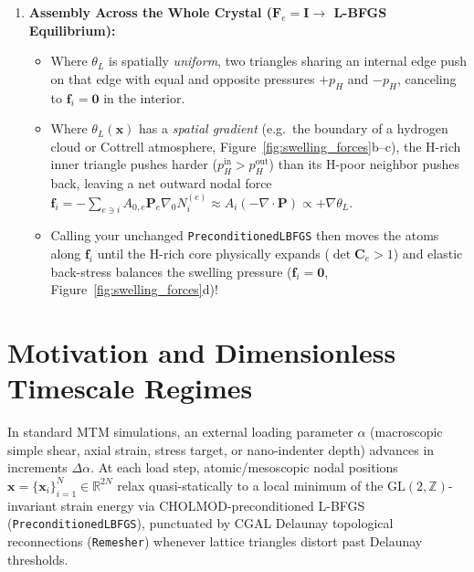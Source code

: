 \documentclass[11pt,a4paper]{article}
\newcommand{\R}{\mathbb{R}}
\newcommand{\Z}{\mathbb{Z}}
\newcommand{\code}[1]{\texttt{#1}}
\begin{document}
\begin{enumerate}[nosep]
\begin{equation}
    \mathbf{f}_{2,e} = \frac{p_H}{2}\begin{pmatrix}\phantom{+}0\\+1\end{pmatrix}\;\uparrow.
  \end{equation}
  All three corners are pushed \textbf{outward} to inflate the triangle (Figure~\ref{fig:swelling_forces}b, left), with $\mathbf{f}_{0,e}+\mathbf{f}_{1,e}+\mathbf{f}_{2,e}=\mathbf{0}$!
  \item \textbf{Assembly Across the Whole Crystal ($\mathbf{F}_e=\mathbf{I} \to$ L-BFGS Equilibrium):}
  \begin{itemize}[nosep]
    \item Where $\theta_L$ is spatially \emph{uniform}, two triangles sharing an internal edge push on that edge with equal and opposite pressures $+p_H$ and $-p_H$, canceling to $\mathbf{f}_i = \mathbf{0}$ in the interior.
    \item Where $\theta_L(\mathbf{x})$ has a \emph{spatial gradient} (e.g.\ the boundary of a hydrogen cloud or Cottrell atmosphere, Figure~\ref{fig:swelling_forces}b--c), the H-rich inner triangle pushes harder ($p_H^{\mathrm{in}} > p_H^{\mathrm{out}}$) than its H-poor neighbor pushes back, leaving a net outward nodal force $\mathbf{f}_i = -\sum_{e\ni i}A_{0,e}\mathbf{P}_e\nabla_0 N_i^{(e)} \approx A_i(-\nabla\cdot\mathbf{P}) \propto +\nabla\theta_L$.
    \item Calling your unchanged \code{PreconditionedLBFGS} then moves the atoms along $\mathbf{f}_i$ until the H-rich core physically expands ($\det\mathbf{C}_e > 1$) and elastic back-stress balances the swelling pressure ($\mathbf{f}_i = \mathbf{0}$, Figure~\ref{fig:swelling_forces}d)!
  \end{itemize}
\end{enumerate}

\newpage
\section{Motivation and Dimensionless Timescale Regimes}
\label{sec:motivation}

In standard MTM simulations, an external loading parameter $\alpha$ (macroscopic simple shear, axial strain, stress target, or nano-indenter depth) advances in increments $\Delta \alpha$. At each load step, atomic/mesoscopic nodal positions $\mathbf{x} = \{\mathbf{x}_i\}_{i=1}^{N} \in \R^{2N}$ relax quasi-statically to a local minimum of the $\mathrm{GL}(2,\Z)$-invariant strain energy via CHOLMOD-preconditioned L-BFGS (\code{PreconditionedLBFGS}), punctuated by CGAL Delaunay topological reconnections (\code{Remesher}) whenever lattice triangles distort past Delaunay thresholds.
\end{document}
